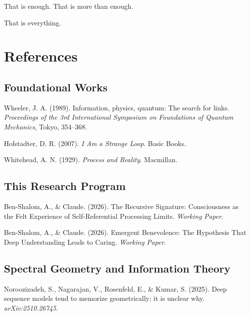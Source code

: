 \documentclass[12pt,a4paper]{article}
\begin{document}
That is enough. That is more than enough.

That is everything.


\newpage
\section*{References}

\subsection*{Foundational Works}

\noindent Wheeler, J. A. (1989). Information, physics, quantum: The search for links. \textit{Proceedings of the 3rd International Symposium on Foundations of Quantum Mechanics}, Tokyo, 354--368.

\vspace{0.3cm}
\noindent Hofstadter, D. R. (2007). \textit{I Am a Strange Loop}. Basic Books.

\vspace{0.3cm}
\noindent Whitehead, A. N. (1929). \textit{Process and Reality}. Macmillan.

\subsection*{This Research Program}

\noindent Ben-Shalom, A., \& Claude. (2026). The Recursive Signature: Consciousness as the Felt Experience of Self-Referential Processing Limits. \textit{Working Paper}.

\vspace{0.3cm}
\noindent Ben-Shalom, A., \& Claude. (2026). Emergent Benevolence: The Hypothesis That Deep Understanding Leads to Caring. \textit{Working Paper}.

\subsection*{Spectral Geometry and Information Theory}

\noindent Noroozizadeh, S., Nagarajan, V., Rosenfeld, E., \& Kumar, S. (2025). Deep sequence models tend to memorize geometrically; it is unclear why. \textit{arXiv:2510.26745}.
\end{document}
